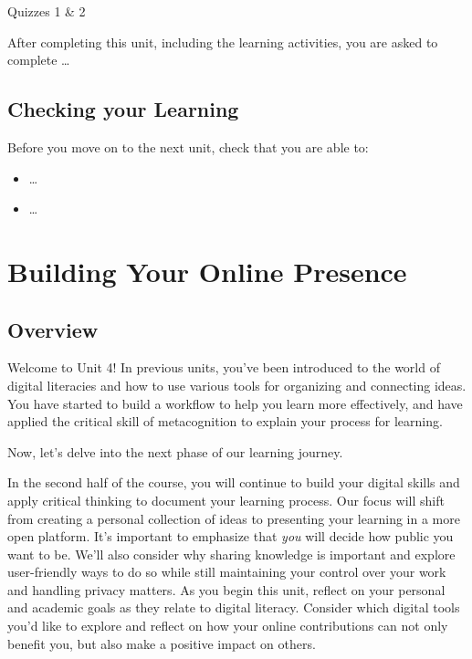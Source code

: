 \documentclass[
]{book}
\providecommand{\tightlist}{%
  \setlength{\itemsep}{0pt}\setlength{\parskip}{0pt}}
\theoremstyle{definition}
\theoremstyle{definition}
\theoremstyle{definition}
\theoremstyle{definition}
\theoremstyle{remark}
\begin{document}
\begin{assessment}
{Quizzes 1 \& 2}

After completing this unit, including the learning activities, you are asked to complete \ldots{}
\end{assessment}

\hypertarget{checking-your-learning-2}{%
\section*{Checking your Learning}\label{checking-your-learning-2}}

\begin{progress}
Before you move on to the next unit, check that you are able to:

\begin{itemize}
\tightlist
\item
  \ldots{}
\item
  \ldots{}
\end{itemize}
\end{progress}

\hypertarget{building-your-online-presence}{%
\chapter{Building Your Online Presence}\label{building-your-online-presence}}

\hypertarget{overview-3}{%
\section*{Overview}\label{overview-3}}

Welcome to Unit 4! In previous units, you've been introduced to the world of digital literacies and how to use various tools for organizing and connecting ideas. You have started to build a workflow to help you learn more effectively, and have applied the critical skill of metacognition to explain your process for learning.

Now, let's delve into the next phase of our learning journey.

In the second half of the course, you will continue to build your digital skills and apply critical thinking to document your learning process. Our focus will shift from creating a personal collection of ideas to presenting your learning in a more open platform. It's important to emphasize that \emph{you} will decide how public you want to be. We'll also consider why sharing knowledge is important and explore user-friendly ways to do so while still maintaining your control over your work and handling privacy matters. As you begin this unit, reflect on your personal and academic goals as they relate to digital literacy. Consider which digital tools you'd like to explore and reflect on how your online contributions can not only benefit you, but also make a positive impact on others.
\end{document}
